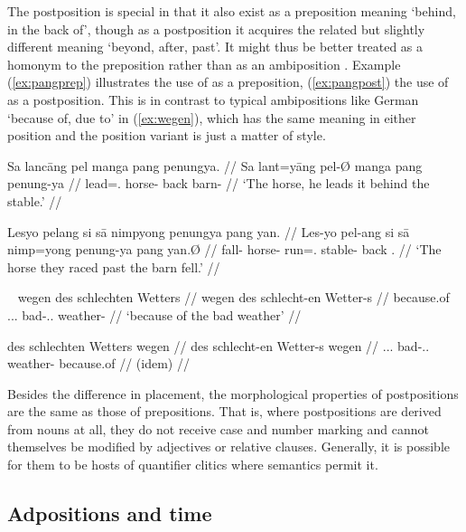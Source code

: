 The postposition  is special in that it also exist as a
preposition meaning `behind, in the back of', though as a postposition it
acquires the related but slightly different meaning `beyond, after, past'. It
might thus be better treated as a homonym to the preposition rather than as an
ambiposition \citep[115]{hagege2010}. Example (\ref{ex:pangprep}) illustrates
the use of  as a preposition, (\ref{ex:pangpost}) the use of
 as a postposition. This is in contrast to typical
ambipositions like German  `because of, due to' in (\ref{ex:wegen}),
which has the same meaning in either position and the position variant is just
a matter of style.

\pex
\a\label{ex:pangprep}\begingl
	\gla Sa lancāng pel manga pang penungya. //
	\glb Sa lant=yāng pel-Ø manga pang penung-ya //
	\glc \PatT{} lead=\TsgM{}.\Aarg{} horse-\Top{} \Dyn{} back 
		barn-\Loc{} //
	\glft `The horse, he leads it behind the stable.' //
\endgl

\a\label{ex:pangpost}\begingl
	\gla Lesyo pelang si sā nimpyong penungya pang yan. //
	\glb Les-yo pel-ang si sā nimp=yong penung-ya pang yan.Ø //
	\glc fall-\TsgN{} horse-\Aarg{} \Rel{} \CauT{} 
		run=\TsgN{}.\Aarg{} stable-\Loc{} back \Tpl{}.\Top{} //
	\glft `The horse they raced past the barn fell.' //
\endgl

\xe

\pex~\label{ex:wegen}
\a\label{ex:wegenprep}\begingl{}%
	\gla wegen des schlechten Wetters //
	\glb wegen des schlecht-en Wetter-s //
	\glc because.of \Def{}.\Gen{}.\N{}.\Sg{} bad-\Gen{}.\N{}.\Sg{} 
		weather-\Gen{} //
	\glft `because of the bad weather' //
\endgl

\a\label{ex:wegenpost}\begingl
	\gla des schlechten Wetters wegen //
	\glb des schlecht-en Wetter-s wegen //
	\glc \Def{}.\Gen{}.\N{}.\Sg{} bad-\Gen{}.\N{}.\Sg{} weather-\Gen{} 
		because.of //
	\glft (idem) //
\endgl

\xe

Besides the difference in placement, the morphological properties of 
postpositions are the same as those of prepositions. That is, where 
postpositions are derived from nouns at all, they do not receive case and 
number marking and cannot themselves be modified by adjectives or relative 
clauses. Generally, it is possible for them to be hosts of quantifier clitics 
where semantics permit it.


\subsection{Adpositions and time}

